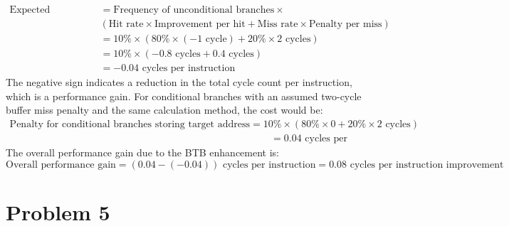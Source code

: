 \documentclass{article}
\begin{document}
\[
\begin{aligned}
    \text{Expected improvement} &= \text{Frequency of unconditional branches} \times \\
    &(\text{Hit rate} \times \text{Improvement per hit} + \text{Miss rate} \times \text{Penalty per miss})\\
    &= 10\% \times (80\% \times (-1 \text{ cycle}) + 20\% \times 2 \text{ cycles})\\
    &= 10\% \times (-0.8 \text{ cycles} + 0.4 \text{ cycles})\\
    &= -0.04 \text{ cycles per instruction}
\end{aligned}
\]
\noindent
The negative sign indicates a reduction in the total cycle count per instruction, which is a performance gain. For conditional branches with an assumed two-cycle buffer miss penalty and the same calculation method, the cost would be:
\[
\begin{aligned}
    \text{Penalty for conditional branches storing target address} 
    = 10\% \times (80\% \times 0 + 20\% \times 2 \text{ cycles})\\
    &= 0.04 \text{ cycles per instruction}
\end{aligned}
\]
The overall performance gain due to the BTB enhancement is:
\begin{equation*}
    \text{Overall performance gain} = (0.04 - (-0.04)) \text{ cycles per instruction}= 0.08 \text{ cycles per instruction improvement}
\end{equation*}


\newpage
\section{Problem 5}
\end{document}
